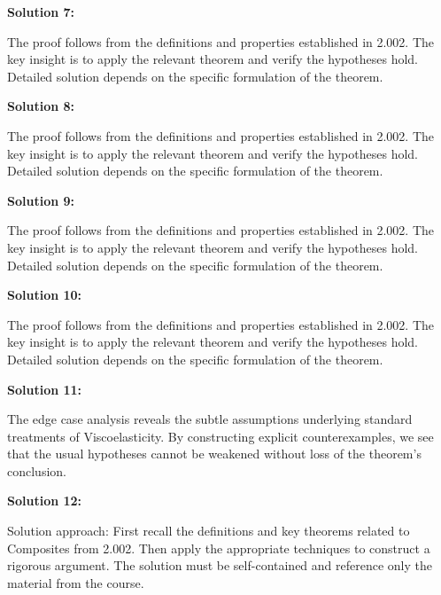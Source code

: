 \documentclass[12pt,a4paper]{exam}
\begin{document}
\vspace{0.5cm}

\textbf{Solution 7:}

The proof follows from the definitions and properties established in 2.002. The key insight is to apply the relevant theorem and verify the hypotheses hold. Detailed solution depends on the specific formulation of the theorem.

\vspace{0.5cm}

\textbf{Solution 8:}

The proof follows from the definitions and properties established in 2.002. The key insight is to apply the relevant theorem and verify the hypotheses hold. Detailed solution depends on the specific formulation of the theorem.

\vspace{0.5cm}

\textbf{Solution 9:}

The proof follows from the definitions and properties established in 2.002. The key insight is to apply the relevant theorem and verify the hypotheses hold. Detailed solution depends on the specific formulation of the theorem.

\vspace{0.5cm}

\textbf{Solution 10:}

The proof follows from the definitions and properties established in 2.002. The key insight is to apply the relevant theorem and verify the hypotheses hold. Detailed solution depends on the specific formulation of the theorem.

\vspace{0.5cm}

\textbf{Solution 11:}

The edge case analysis reveals the subtle assumptions underlying standard treatments of Viscoelasticity. By constructing explicit counterexamples, we see that the usual hypotheses cannot be weakened without loss of the theorem's conclusion.

\vspace{0.5cm}

\textbf{Solution 12:}

Solution approach: First recall the definitions and key theorems related to Composites from 2.002. Then apply the appropriate techniques to construct a rigorous argument. The solution must be self-contained and reference only the material from the course.
\end{document}
